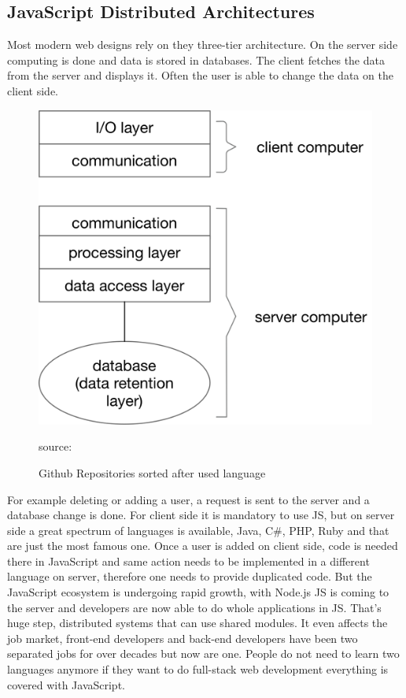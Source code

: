 \newpage

\subsection{JavaScript Distributed Architectures}
Most modern web designs rely on they three-tier architecture. On the server side computing is done and data is stored in databases. The client fetches the data from the server and displays it. Often the user is able to change the data on the client side. 

\begin{figure}[hb]
	\centering
	\includegraphics[scale=0.5]{bilder/grundlagen/Three-Tier.png}
	\caption{Github Repositories sorted after used language} source:\cite{JS}
	\label{fig:JS}
\end{figure}


For example deleting or adding a user, a request is sent to the server and a database change is done. For client side it is mandatory to use \gls{JS}, but on server side  a great spectrum of languages is available, Java, C#, PHP, Ruby and that are just the most famous one. Once a user is added on client side, code is needed there in JavaScript and same action needs to be implemented in a different language on server, therefore one needs to provide duplicated code. But the JavaScript ecosystem is undergoing rapid growth, with Node.js \gls{JS} is coming to the server and developers are now able to do whole applications in \gls{JS}. That's huge step, distributed systems that can use shared modules. It even affects the job market, front-end developers and back-end developers have been two separated jobs for over decades but now are one. People do not need to learn two languages anymore if they want to do full-stack web development everything is covered with JavaScript.






